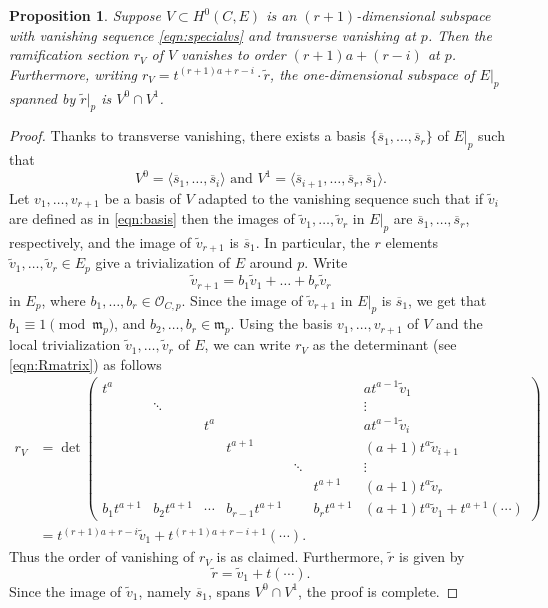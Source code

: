 \documentclass[11pt,reqno]{amsart}
\theoremstyle{plain}
\newtheorem{proposition}[theorem]{Proposition}
\theoremstyle{definition}
\theoremstyle{remark}
\numberwithin{equation}{section}
\numberwithin{equation}{section}
\renewcommand{\O}{\mathcal O}
\begin{document}
\begin{proposition}\label{prop:agreement}
  Suppose $V \subset H^0(C, E)$ is an $(r+1)$-dimensional subspace with vanishing sequence \eqref{eqn:specialvs} and transverse vanishing at $p$.
  Then the ramification section $r_V$ of $V$ vanishes to order $(r+1)a + (r-i)$ at $p$.
  Furthermore, writing $r_V = t^{(r+1)a+r-i} \cdot \widetilde r$, the one-dimensional subspace of $E|_p$ spanned by $\widetilde r|_p$ is $V^0 \cap V^1$.
\end{proposition}
\begin{proof}
  Thanks to transverse vanishing, there exists a basis $\{\overline s_1, \dots, \overline s_{r} \}$ of $E|_p$ such that
  \[ V^0 = \langle  \overline s_1, \dots, \overline s_i \rangle \text{ and } V^1 = \langle  \overline s_{i+1}, \dots, \overline s_r, \overline s_1 \rangle.\]
  Let $v_1, \dots, v_{r+1}$ be a basis of $V$ adapted to the vanishing sequence such that if $\widetilde v_i$ are defined as in \eqref{eqn:basis} then the images of $\widetilde v_1, \dots, \widetilde v_r$ in $E|_p$ are $\overline s_1, \dots, \overline s_r$, respectively, and the image of $\widetilde v_{r+1}$ is $\overline s_1$.
  In particular, the $r$ elements $\widetilde v_1, \dots, \widetilde v_r \in E_p$ give a trivialization of $E$ around $p$.
  Write
  \[ \widetilde v_{r+1} = b_1 \widetilde v_1 + \dots + b_r \widetilde v_r\]
  in $E_p$, where $b_1, \dots, b_r \in \O_{C,p}$.
  Since the image of $\widetilde v_{r+1}$ in $E|_p$ is $\overline s_1$, we get that $b_1 \equiv 1 \pmod {\mathfrak m_p}$, and $b_2, \dots, b_r \in \mathfrak m_p$.  
  Using the basis $v_1, \dots, v_{r+1}$ of $V$ and the local trivialization $\widetilde v_1, \dots, \widetilde v_r$ of $E$, we can write $r_V$ as the determinant (see \eqref{eqn:Rmatrix}) as follows
  \begin{align*}
    r_V &= \det
    \begin{pmatrix}
      t^a & & & & & &  at^{a-1}\widetilde v_1\\
       & \ddots & & & & &\vdots\\
       & & t^a  & & & &a t^{a-1}\widetilde v_i\\
       & & & t^{a+1}  & & &(a+1)t^a \widetilde v_{i+1} \\
       & & & & \ddots & & \vdots\\
       & & & & &t^{a+1} &(a+1)t^{a}\widetilde v_r\\
      b_1t^{a+1}& b_2 t^{a+1} & \cdots & b_{r-1}t^{a+1} & & b_rt^{a+1} & (a+1)t^a\widetilde v_1 + t^{a+1}(\cdots)
    \end{pmatrix}\\
        &= t^{(r+1)a+r-i} \widetilde v_1  + t^{(r+1)a+r-i+1} (\cdots).
  \end{align*}
  Thus the order of vanishing of $r_V$ is as claimed.
  Furthermore, $\widetilde r$ is given by
  \[ \widetilde r = \widetilde v_1 + t (\cdots).\]
  Since the image of $\widetilde v_1$, namely $\overline s_1$, spans $V^0 \cap V^1$, the proof is complete.
\end{proof}
\end{document}
